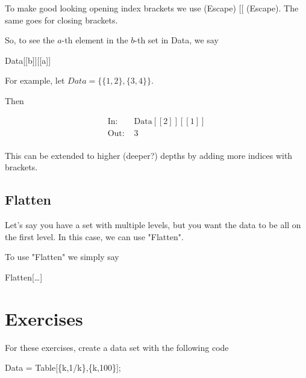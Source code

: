 \documentclass[11pt,a4paper,twoside]{article}
\begin{document}
				To make good looking opening index brackets we use (Escape) [[ (Escape).  The same goes for closing brackets.
					
				So, to see the $a$-th element in the $b$-th set in Data, we say
					
				\begin{center} Data[[b]][[a]] \end{center}
					
				For example, let $ Data = \{ \{ 1,2 \} , \{ 3,4 \} \} $.
					
				Then 
					
				\begin{align*}
					\text{In: }& \text{Data}[[2]][[1]] \\
					\text{Out: }& 3 \\
				\end{align*}
					
					This can be extended to higher (deeper?) depths by adding more indices with brackets.
					
			\subsection{Flatten}
					
				Let's say you have a set with multiple levels, but you want the data to be all on the first level.  In this case, we can use "Flatten".
				
				To use "Flatten" we simply say
					
				\begin{center} Flatten[\dots] \end{center}
				
		\section{Exercises}
		
			For these exercises, create a data set with the following code
			
			\begin{center}
			
				Data = Table[\{k,1/k\},\{k,100\}];
			
			\end{center}
		
\end{document}
